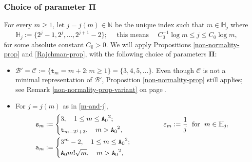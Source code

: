 \documentclass[12pt, twoside]{article}
\theoremstyle{definition}
\numberwithin{equation}{section}
\begin{document}
\subsubsection{Choice of parameter $\pmb{\Pi}$} 
For every $m \geq 1$, let $j = j(m) \in \mathbb N$ be the unique index such that $m \in \mathbb H_j$ where 
\begin{equation} \label{m-and-j}
\mathbb H_j := \bigl\{2^j-1, 2^j, \ldots, 2^{j+1}-2 \bigr\}; \quad \text{ this means } \quad C_0^{-1} \log m \leq j \leq C_0 \log m,   
\end{equation} 
for some absolute constant $C_0 > 0$.  We will apply Propositions  \ref{non-normality-prop} and \ref{Rajchman-prop}, with the following choice of parameters $\pmb{\Pi}$: 
\begin{itemize}
	\item $\mathscr{B}' = \mathscr{C} := \{\mathtt t_m = m+2 : m \geq 1 \} = \{3, 4, 5, \ldots \}$. Even though $\mathscr{C}$ is not a minimal representation of $\mathscr{B}'$, Proposition \ref{non-normality-prop} still applies; see  Remark \ref{non-normality-prop-variant} on page \pageref{non-normality-prop-variant}.
	\item 
	For $j = j(m)$ as in \eqref{m-and-j}, 
	\begin{align}
		&\mathtt s_m := \left\{\begin{aligned}
			&3,\quad 1 \le m \le {\mathtt A_0}^2;\\
			&\mathtt t_{m - 2^j + 2},\quad  m > {\mathtt A_0}^2,
		\end{aligned}\right. \hskip0.8in 
		\varepsilon_m := \frac{1}{j} \; \text{ for } \; m \in \mathbb H_j, \label{pi-1}\\
		&\mathtt a_m := \left\{\begin{aligned}
			&3^m - 2,\quad 1 \le  m  \le {\mathtt A_0}^2;\\
			&\mathtt A_0 m! \sqrt{m},\quad  m > {\mathtt A_0}^2,
		\end{aligned}\right.\hskip0.55in 

\end{align}
\end{itemize}
\end{document}
